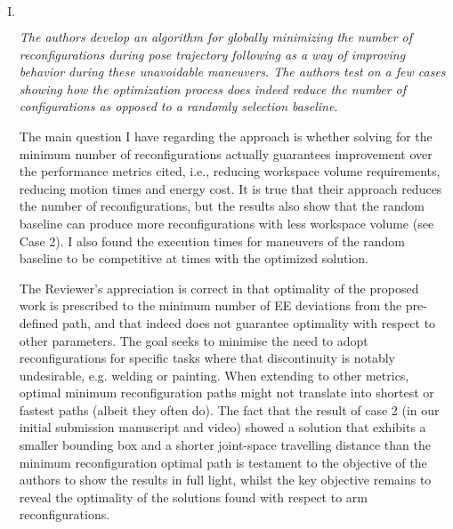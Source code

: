 \documentclass[11pt]{article}
\newenvironment{reviewer}
{\begin{mdframed}[roundcorner = 10pt,fontcolor=blue!70!black]\itshape}
{\end{mdframed}}
\begin{document}
\begin{enumerate}[I.]

  \item $ $
  \begin{reviewer}
The authors develop an algorithm for globally minimizing the number of reconfigurations during pose trajectory following as a way of improving behavior during 
these unavoidable maneuvers. The authors test on a few cases showing how the optimization process does indeed reduce the number of configurations as 
opposed to a randomly selection baseline.

  The main question I have regarding the approach is whether solving for the minimum number of reconfigurations actually guarantees improvement over the performance metrics 
cited, i.e., reducing workspace volume requirements, reducing motion times and energy cost. 
It is true that their approach reduces the number of reconfigurations, but the results also show that the random baseline can produce more reconfigurations with less workspace volume (see Case 2). I also found the execution times for maneuvers of the random baseline to be competitive at times with the optimized solution. 
   \end{reviewer}

\noindent
The Reviewer's appreciation is correct in that optimality of the proposed work is prescribed to the minimum number of EE deviations from the pre-defined path, and that indeed does not guarantee optimality with respect to other parameters. The goal seeks to minimise the need to adopt reconfigurations for specific tasks where that discontinuity is notably undesirable, e.g. welding or painting. When extending to other metrics, optimal minimum reconfiguration paths might not translate into shortest or fastest paths (albeit they often do). 
The fact that the result of case 2 (in our initial submission manuscript and video) showed a solution that exhibits a smaller bounding box and a shorter joint-space travelling distance than the minimum reconfiguration optimal path is testament to the objective of the authors to show the results in full light, whilst the key objective remains to reveal the optimality of the solutions found with respect to arm reconfigurations. 


\end{enumerate}
\end{document}
